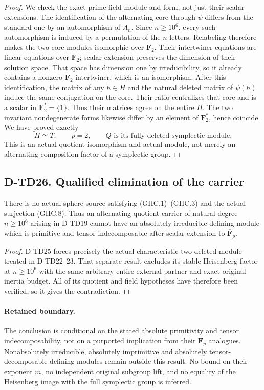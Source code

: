 \begin{proof}
We check the exact prime-field module and form, not just their
scalar extensions.  The identification of the alternating core
through $\psi$ differs from the standard one by an automorphism
of $A_n$.  Since $n\ge10^6$, every such automorphism is induced
by a permutation of the $n$ letters.  Relabeling therefore makes
the two core modules isomorphic over $\overline{\mathbf F}_2$.
Their intertwiner equations are linear equations over
$\mathbf F_2$; scalar extension preserves the dimension of
their solution space.  That space has dimension one by
irreducibility, so it already contains a nonzero
$\mathbf F_2$-intertwiner, which is an isomorphism.
After this identification, the matrix of any $h\in H$ and
the natural deleted matrix of $\psi(h)$ induce the same
conjugation on the core.  Their ratio centralizes that core
and is a scalar in $\mathbf F_2^*=\{1\}$.  Thus their
matrices agree on the entire $H$.  The two invariant
nondegenerate forms likewise differ by an element of
$\mathbf F_2^*$, hence coincide.  We have proved exactly
\[
                   H\simeq T,\qquad p=2,\qquad
                   Q\text{ is its fully deleted symplectic module}.
 \tag{GHC.12}
\]
This is an actual quotient isomorphism and actual module, not
merely an alternating composition factor of a symplectic group.
\end{proof}

\subsection*{D-TD26. Qualified elimination of the carrier}

\begin{corollary}[D-TD26, using D-TD22--23]
There is no actual sphere source satisfying (GHC.1)--(GHC.3)
and the actual surjection (GHC.8).  Thus an alternating quotient
carrier of natural degree $n\ge10^6$ arising in D-TD19 cannot
have an absolutely irreducible defining module which is primitive
and tensor-indecomposable after scalar extension to
$\overline{\mathbf F}_p$.
\end{corollary}

\begin{proof}
D-TD25 forces precisely the actual characteristic-two deleted
module treated in D-TD22--23.  That separate result excludes its
stable Heisenberg factor at $n\ge10^6$ with the same arbitrary
entire external partner and exact original inertia budget.
All of its quotient and field hypotheses have therefore been
verified, so it gives the contradiction.
\end{proof}

\paragraph{Retained boundary.}
The conclusion is conditional on the stated absolute primitivity
and tensor indecomposability, not on a purported implication
from their $\mathbf F_p$ analogues.  Nonabsolutely irreducible,
absolutely imprimitive and absolutely tensor-decomposable defining
modules remain outside this result.  No bound on their exponent
$m$, no independent original subgroup lift, and no equality of
the Heisenberg image with the full symplectic group is inferred.
